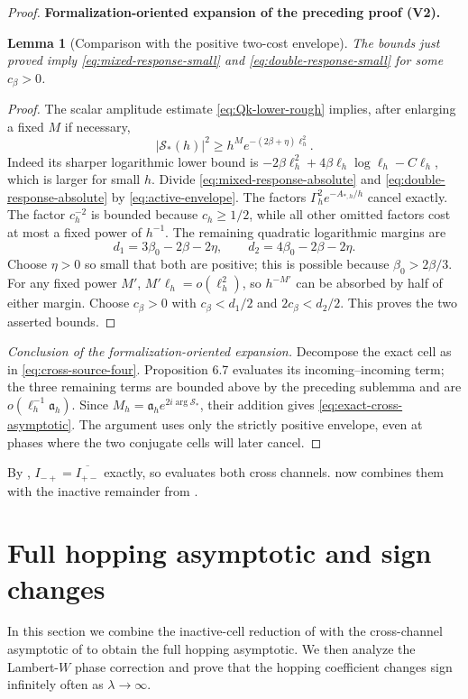 \documentclass[11pt]{article}
\newtheorem{lemma}[theorem]{Lemma}
\newcommand{\formalisationparentid}{X}
\newenvironment{formalisationaddition}[1]{\par\medskip\begingroup\color{blue}\def\formalisationparentid{#1}\setcounter{formalizationsublemma}{0}\let\lemma\formalizationsublemma\let\endlemma\endformalizationsublemma
  \def\Eo{\mathcal E_h^\circ}\def\EE{\mathcal E_h}\def\phio{\phi_h^\circ}\def\phih{\phi_h}\def\Ho{H_h^{\rm atom}(v^\circ)}\def\Ha{H_h^{\rm atom}}\def\HL{H_h^{L}}\def\Dh{D_h}\def\Log{\operatorname{Log}}\def\ellh{\ell_h}\def\Gp{G_{p,h}}\def\Ast{A_{*,h}}\def\ahat{\widehat{\mathfrak a}_h}\def\ah{\mathfrak a_h}\def\rh{\widehat\rho_h}\def\deltah{\widehat\delta_h}\def\oldref##1{\textup{(##1)}}\def\interface##1{\par\noindent\textit{Analytical interface used here.} ##1\par}\def\finish{\par\noindent\textit{Conclusion of the formalization-oriented expansion.} }\par\noindent\textbf{Formalization-oriented expansion of the preceding proof (V2).}\par\smallskip
}{\par\endgroup\medskip
}
\begin{document}
\begin{proof}
\begin{formalisationaddition}{P6.8}
\begin{lemma}[Comparison with the positive two-cost envelope]\label{sublemma:P6-8-envelope}
The bounds just proved imply \eqref{eq:mixed-response-small} and \eqref{eq:double-response-small} for some $c_\beta>0$.
\end{lemma}
\begin{proof}
The scalar amplitude estimate \eqref{eq:Qk-lower-rough} implies, after enlarging a fixed $M$ if necessary,
\begin{equation*}
 |\mathcal S_*(h)|^2\ge h^M e^{-(2\beta+\eta)\ellh^2}.
\end{equation*}
Indeed its sharper logarithmic lower bound is $-2\beta\ellh^2+4\beta\ellh\log\ellh-C\ellh$, which is larger for small $h$. Divide \eqref{eq:mixed-response-absolute} and \eqref{eq:double-response-absolute} by \eqref{eq:active-envelope}. The factors $\Gamma_h^2e^{-\Ast/h}$ cancel exactly. The factor $c_h^{-2}$ is bounded because $c_h\ge1/2$, while all other omitted factors cost at most a fixed power of $h^{-1}$. The remaining quadratic logarithmic margins are
\[
 d_1=3\beta_0-2\beta-2\eta,
 \qquad d_2=4\beta_0-2\beta-2\eta.
\]
Choose $\eta>0$ so small that both are positive; this is possible because $\beta_0>2\beta/3$. For any fixed power $M'$, $M'\ellh=o(\ellh^2)$, so $h^{-M'}$ can be absorbed by half of either margin. Choose $c_\beta>0$ with $c_\beta<d_1/2$ and $2c_\beta<d_2/2$. This proves the two asserted bounds.
\end{proof}
\finish Decompose the exact cell as in \eqref{eq:cross-source-four}. Proposition 6.7 evaluates its incoming--incoming term; the three remaining terms are bounded above by the preceding sublemma and are $o(\ellh^{-1}\ah)$. Since $M_h=\ah e^{2i\arg \mathcal S_*}$, their addition gives \eqref{eq:exact-cross-asymptotic}. The argument uses only the strictly positive envelope, even at phases where the two conjugate cells will later cancel.
\end{formalisationaddition}

\end{proof}

By ,
$I_{-+}=\overline{I_{+-}}$ exactly, so 
evaluates both cross channels.   now
combines them with the inactive remainder from .

\section{Full hopping asymptotic and sign changes}
\label{sec:full-hopping-section}
In this section we combine the inactive-cell reduction of
 with the cross-channel asymptotic of
 to obtain the full hopping asymptotic.  We
then analyze the Lambert-$W$ phase correction and prove that the hopping
coefficient changes sign infinitely often as $\lambda\to\infty$.
\end{document}
